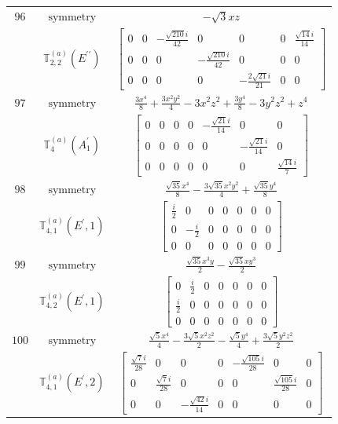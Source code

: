 \documentclass[fleqn,8pt,landscape]{jsarticle}
\begin{document}
\begin{longtable}{ccc}
$ 96 $ & $ \text{symmetry} $ & $ - \sqrt{3} x z $ \\
$  $ & $ \mathbb{T}_{2,2}^{(a)}(E^{\prime\prime}) $ & $ \begin{bmatrix} 0 & 0 & - \frac{\sqrt{210} i}{42} & 0 & 0 & 0 & \frac{\sqrt{14} i}{14} \\ 0 & 0 & 0 & - \frac{\sqrt{210} i}{42} & 0 & 0 & 0 \\ 0 & 0 & 0 & 0 & - \frac{2 \sqrt{21} i}{21} & 0 & 0 \end{bmatrix} $ \\ \hline
$ 97 $ & $ \text{symmetry} $ & $ \frac{3 x^{4}}{8} + \frac{3 x^{2} y^{2}}{4} - 3 x^{2} z^{2} + \frac{3 y^{4}}{8} - 3 y^{2} z^{2} + z^{4} $ \\
$  $ & $ \mathbb{T}_{4}^{(a)}(A_{1}^{\prime}) $ & $ \begin{bmatrix} 0 & 0 & 0 & 0 & - \frac{\sqrt{21} i}{14} & 0 & 0 \\ 0 & 0 & 0 & 0 & 0 & - \frac{\sqrt{21} i}{14} & 0 \\ 0 & 0 & 0 & 0 & 0 & 0 & \frac{\sqrt{14} i}{7} \end{bmatrix} $ \\ \hline
$ 98 $ & $ \text{symmetry} $ & $ \frac{\sqrt{35} x^{4}}{8} - \frac{3 \sqrt{35} x^{2} y^{2}}{4} + \frac{\sqrt{35} y^{4}}{8} $ \\
$  $ & $ \mathbb{T}_{4,1}^{(a)}(E^{\prime},1) $ & $ \begin{bmatrix} \frac{i}{2} & 0 & 0 & 0 & 0 & 0 & 0 \\ 0 & - \frac{i}{2} & 0 & 0 & 0 & 0 & 0 \\ 0 & 0 & 0 & 0 & 0 & 0 & 0 \end{bmatrix} $ \\ \hline
$ 99 $ & $ \text{symmetry} $ & $ \frac{\sqrt{35} x^{3} y}{2} - \frac{\sqrt{35} x y^{3}}{2} $ \\
$  $ & $ \mathbb{T}_{4,2}^{(a)}(E^{\prime},1) $ & $ \begin{bmatrix} 0 & \frac{i}{2} & 0 & 0 & 0 & 0 & 0 \\ \frac{i}{2} & 0 & 0 & 0 & 0 & 0 & 0 \\ 0 & 0 & 0 & 0 & 0 & 0 & 0 \end{bmatrix} $ \\ \hline
$ 100 $ & $ \text{symmetry} $ & $ \frac{\sqrt{5} x^{4}}{4} - \frac{3 \sqrt{5} x^{2} z^{2}}{2} - \frac{\sqrt{5} y^{4}}{4} + \frac{3 \sqrt{5} y^{2} z^{2}}{2} $ \\
$  $ & $ \mathbb{T}_{4,1}^{(a)}(E^{\prime},2) $ & $ \begin{bmatrix} \frac{\sqrt{7} i}{28} & 0 & 0 & 0 & - \frac{\sqrt{105} i}{28} & 0 & 0 \\ 0 & \frac{\sqrt{7} i}{28} & 0 & 0 & 0 & \frac{\sqrt{105} i}{28} & 0 \\ 0 & 0 & - \frac{\sqrt{42} i}{14} & 0 & 0 & 0 & 0 \end{bmatrix} $ \\ \hline

\end{longtable}
\end{document}
